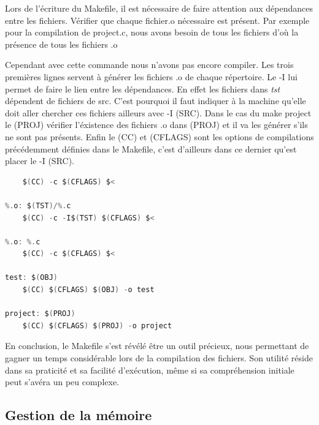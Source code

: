 \documentclass{article}
\begin{document}
\vspace{1em} Lors de l'écriture du Makefile, il est nécessaire de faire attention aux dépendances entre les fichiers. Vérifier que chaque fichier.o nécessaire est présent. Par exemple pour la compilation de  project.c, nous avons besoin de tous les fichiers d'où la présence de tous les fichiers .o 

\newpage


\vspace{1em} Cependant avec cette commande nous n'avons pas encore compiler. Les trois premières lignes servent à générer les fichiers .o de chaque répertoire. Le -I lui permet de faire le lien entre les dépendances. En effet les fichiers dans \emph{tst} dépendent de fichiers de src. C'est  pourquoi il faut indiquer à la machine qu'elle doit aller chercher ces fichiers ailleurs avec -I \textdollar(SRC). Dans le cas du make project le \textdollar(PROJ) vérifier l'éxistence des fichiers .o dans \textdollar(PROJ) et il va les générer s'ils ne sont pas présents. Enfin le \textdollar(CC) et \textdollar(CFLAGS) sont les options de compilations précédemment définies dans le Makefile, c'est d'ailleurs dans ce dernier qu'est placer le -I \textdollar(SRC).

\begin{tcolorbox}[colback=gray!10,colframe=white!75!black]
\begin{lstlisting}[language=C, caption={Commande de compilation}, label={lst:exemple1-c}]
%.o: $(SRC)/%.c
	$(CC) -c $(CFLAGS) $<

%.o: $(TST)/%.c
	$(CC) -c -I$(TST) $(CFLAGS) $<

%.o: %.c
	$(CC) -c $(CFLAGS) $<

test: $(OBJ)
	$(CC) $(CFLAGS) $(OBJ) -o test

project: $(PROJ)
	$(CC) $(CFLAGS) $(PROJ) -o project

\end{lstlisting}
\end{tcolorbox}
\vspace{1em} En conclusion, le Makefile s'est révélé être un outil précieux, nous permettant de gagner un temps considérable lors de la compilation des fichiers. Son utilité réside dans sa praticité et sa facilité d'exécution, même si sa compréhension initiale peut s'avéra un peu complexe.

\subsection{Gestion de la mémoire}
\end{document}
